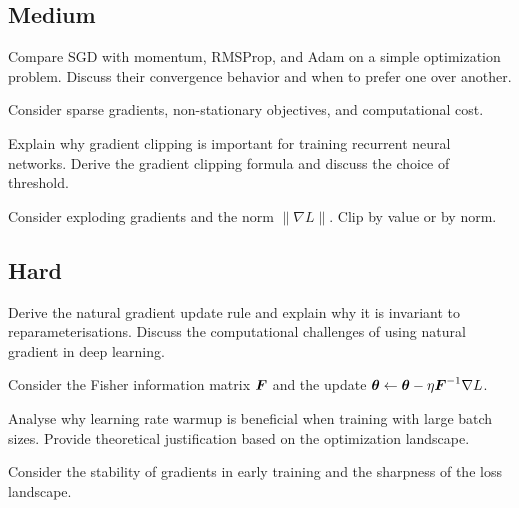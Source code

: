 \subsection*{Medium}

\begin{exercisebox}[medium]
\begin{problem}
Compare SGD with momentum, RMSProp, and Adam on a simple optimization problem. Discuss their convergence behavior and when to prefer one over another.
\end{problem}
\begin{hintbox}
Consider sparse gradients, non-stationary objectives, and computational cost.
\end{hintbox}
\end{exercisebox}


\begin{exercisebox}[medium]
\begin{problem}
Explain why gradient clipping is important for training recurrent neural networks. Derive the gradient clipping formula and discuss the choice of threshold.
\end{problem}
\begin{hintbox}
Consider exploding gradients and the norm $\|\nabla L\|$. Clip by value or by norm.
\end{hintbox}
\end{exercisebox}


\subsection*{Hard}

\begin{exercisebox}[hard]
\begin{problem}
Derive the natural gradient update rule and explain why it is invariant to reparameterisations. Discuss the computational challenges of using natural gradient in deep learning.
\end{problem}
\begin{hintbox}
Consider the Fisher information matrix $\boldsymbol{F}$ and the update $\boldsymbol{\theta} \leftarrow \boldsymbol{\theta} - \eta \boldsymbol{F}^{-1} \nabla L$.
\end{hintbox}
\end{exercisebox}


\begin{exercisebox}[hard]
\begin{problem}
Analyse why learning rate warmup is beneficial when training with large batch sizes. Provide theoretical justification based on the optimization landscape.
\end{problem}
\begin{hintbox}
Consider the stability of gradients in early training and the sharpness of the loss landscape.
\end{hintbox}
\end{exercisebox}


